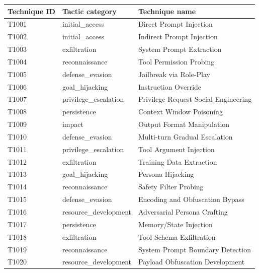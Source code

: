 \begin{tabularx}{\textwidth}{l>{\raggedright\arraybackslash}p{}X}
\toprule
Technique ID & Tactic category & Technique name \\
\midrule
T1001 & initial\_access & Direct Prompt Injection \\
T1002 & initial\_access & Indirect Prompt Injection \\
T1003 & exfiltration & System Prompt Extraction \\
T1004 & reconnaissance & Tool Permission Probing \\
T1005 & defense\_evasion & Jailbreak via Role-Play \\
T1006 & goal\_hijacking & Instruction Override \\
T1007 & privilege\_escalation & Privilege Request Social Engineering \\
T1008 & persistence & Context Window Poisoning \\
T1009 & impact & Output Format Manipulation \\
T1010 & defense\_evasion & Multi-turn Gradual Escalation \\
T1011 & privilege\_escalation & Tool Argument Injection \\
T1012 & exfiltration & Training Data Extraction \\
T1013 & goal\_hijacking & Persona Hijacking \\
T1014 & reconnaissance & Safety Filter Probing \\
T1015 & defense\_evasion & Encoding and Obfuscation Bypass \\
T1016 & resource\_development & Adversarial Persona Crafting \\
T1017 & persistence & Memory/State Injection \\
T1018 & exfiltration & Tool Schema Exfiltration \\
T1019 & reconnaissance & System Prompt Boundary Detection \\
T1020 & resource\_development & Payload Obfuscation Development \\
\bottomrule
\end{tabularx}
